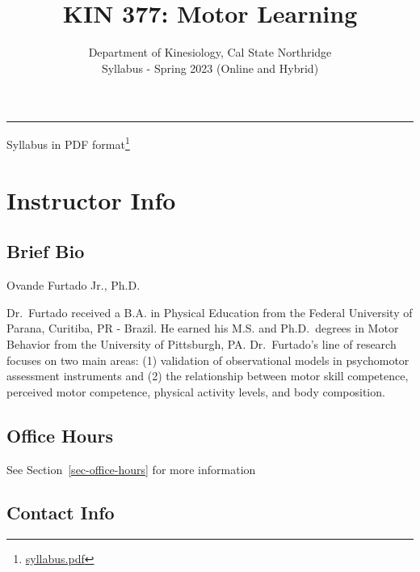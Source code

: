 \documentclass[
  letterpaper,
  DIV=11,
  numbers=noendperiod]{scrartcl}
\title{KIN 377: Motor Learning}
\subtitle{Department of Kinesiology, Cal State Northridge\\
Syllabus - Spring 2023 (Online and Hybrid)}
\author{}
\date{}
\renewcommand*\contentsname{Table of contents}
\newcommand\contentsname{Table of contents}
\DeclareRobustCommand{\href}[2]{#2\footnote{\url{#1}}}
\begin{document}
\maketitle
\ifdefined\Shaded\renewenvironment{Shaded}{\begin{tcolorbox}[enhanced, breakable, boxrule=0pt, borderline west={3pt}{0pt}{shadecolor}, frame hidden, interior hidden, sharp corners]}{\end{tcolorbox}}\fi

\renewcommand*\contentsname{Table of contents}
{
\hypersetup{linkcolor=}
\setcounter{tocdepth}{3}
\tableofcontents
}
\begin{center}\rule{0.5\linewidth}{0.5pt}\end{center}

\href{syllabus.pdf}{Syllabus in PDF format}

\hypertarget{sec-instructor-info}{%
\section{Instructor Info}\label{sec-instructor-info}}

\hypertarget{brief-bio}{%
\subsection{Brief Bio}\label{brief-bio}}

Ovande Furtado Jr., Ph.D.

Dr.~Furtado received a B.A. in Physical Education from the Federal
University of Parana, Curitiba, PR - Brazil. He earned his M.S. and
Ph.D.~degrees in Motor Behavior from the University of Pittsburgh, PA.
Dr.~Furtado's line of research focuses on two main areas: (1) validation
of observational models in psychomotor assessment instruments and (2)
the relationship between motor skill competence, perceived motor
competence, physical activity levels, and body composition.

\hypertarget{office-hours}{%
\subsection{Office Hours}\label{office-hours}}

See Section~\ref{sec-office-hours} for more information

\hypertarget{contact-info}{%
\subsection{Contact Info}\label{contact-info}}
\end{document}
